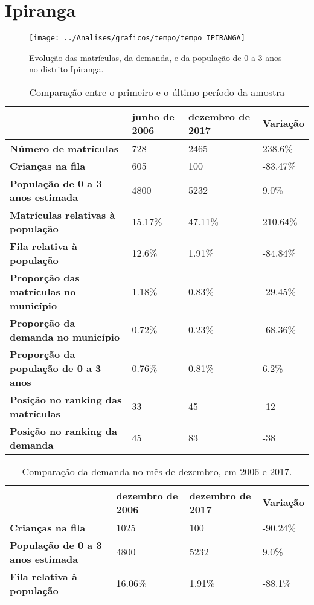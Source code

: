 \section{Ipiranga}
\begin{figure}[H]
\centering
\texttt{[image: ../Analises/graficos/tempo/tempo\_IPIRANGA]}
\caption{Evolução das matrículas, da demanda, e da população de 0 a 3 anos no distrito Ipiranga.}
\end{figure}
\begin{table}[H]
\begin{tabular}{|l|l|l|l|}
\hline
\textbf{}                                      & \textbf{junho de 2006}       & \textbf{dezembro de 2017}    & \textbf{Variação} \\ \hline
\textbf{Número de matrículas}                  & 728 & 2465 & 238.6\% \\ \hline
\textbf{Crianças na fila}                      & 605 & 100 & -83.47\% \\ \hline
\textbf{População de 0 a 3 anos estimada}      & 4800 & 5232 & 9.0\% \\ \hline
\textbf{Matrículas relativas à população}      & 15.17\% & 47.11\% & 210.64\% \\ \hline
\textbf{Fila relativa à população}             & 12.6\% & 1.91\% & -84.84\% \\ \hline
\textbf{Proporção das matrículas no município} & 1.18\% & 0.83\% & -29.45\% \\ \hline
\textbf{Proporção da demanda no município}     & 0.72\% & 0.23\% & -68.36\% \\ \hline
\textbf{Proporção da população de 0 a 3 anos}  & 0.76\% & 0.81\% & 6.2\% \\ \hline
\textbf{Posição no ranking das matrículas}     & 33 & 45 & -12 \\ \hline
\textbf{Posição no ranking da demanda}         & 45 & 83 & -38 \\ \hline
\end{tabular}
\caption{Comparação entre o primeiro e o último período da amostra}
\end{table}
\begin{table}[H]
\begin{tabular}{|l|l|l|l|}
\hline
\textbf{}                                 & \textbf{dezembro de 2006} & \textbf{dezembro de 2017} & \textbf{Variação} \\ \hline
\textbf{Crianças na fila}                      & 1025 & 100 & -90.24\% \\ \hline
\textbf{População de 0 a 3 anos estimada}      & 4800 & 5232 & 9.0\% \\ \hline
\textbf{Fila relativa à população}             & 16.06\% & 1.91\% & -88.1\% \\ \hline
\end{tabular}
\caption{Comparação da demanda no mês de dezembro, em 2006 e 2017.}
\end{table}
